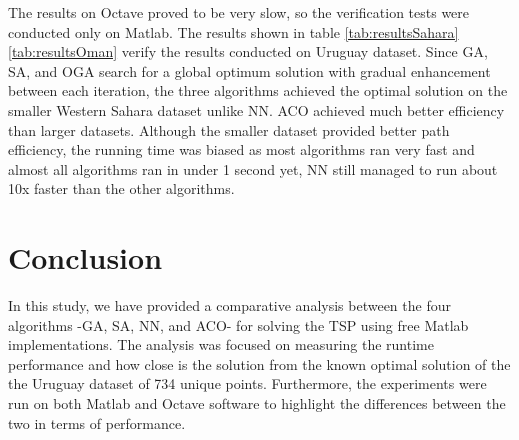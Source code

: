 \documentclass[twocolumn]{article}
\begin{document}
	\begin{table}[h!]
		\caption{Results on Oman Dataset}
		\label{tab:resultsOman}
	\end{table}
	
	The results on Octave proved to be very slow, so the verification tests were conducted only on Matlab.
	The results shown in table \ref{tab:resultsSahara} \ref{tab:resultsOman} verify the results conducted on Uruguay dataset. Since GA, SA, and OGA search for a global optimum solution with gradual enhancement between each iteration, the three algorithms achieved the optimal solution on the smaller Western Sahara dataset unlike NN. ACO achieved much better efficiency than larger datasets.
	Although the smaller dataset provided better path efficiency, the running time was biased as most algorithms ran very fast and almost all algorithms ran in under 1 second yet, NN still managed to run about 10x faster than the other algorithms.
	
	\section{Conclusion}
	In this study, we have provided a comparative analysis between the four algorithms -GA, SA, NN, and ACO- for solving the TSP using free {Matlab\texttrademark} implementations. The analysis was focused on measuring the runtime performance and how close is the solution from the known optimal solution of the the Uruguay dataset of 734 unique points. Furthermore, the experiments were run on both {Matlab\texttrademark} and Octave software to highlight the differences between the two in terms of performance.
	
\end{document}
